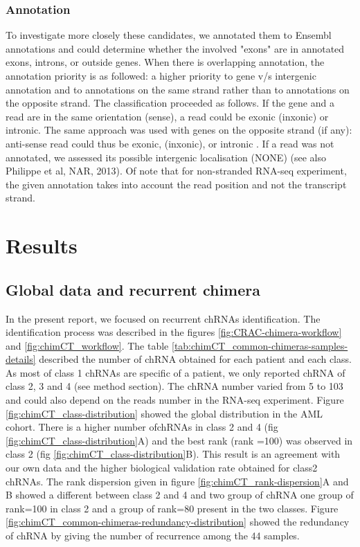 \documentclass[a4paper]{article}
\newcommand{\nbsamples}{44\xspace}
\begin{document}
\subsubsection{Annotation}

To investigate more closely these candidates, we annotated them to Ensembl annotations 
and could determine whether the involved "exons" are in annotated exons, introns, or 
outside genes. When there is overlapping annotation, the annotation priority is as followed: 
a higher priority to gene v/s intergenic annotation and to annotations on the same strand 
rather than to annotations on the opposite strand. The classification proceeded as follows. If 
the gene and a read are in the same orientation (sense), a read could be exonic (inxonic) or 
intronic. The same approach was used with genes on the opposite strand (if any): anti-sense 
read could thus be exonic, (inxonic), or intronic . If a read was not annotated, we assessed 
its possible intergenic localisation (NONE) (see also Philippe et al, NAR, 2013). Of note that 
for non-stranded RNA-seq experiment, the given annotation takes into account the read 
position and not the transcript strand.

\section{Results}

\subsection{Global data and recurrent chimera}

In the present report, we focused on recurrent chRNAs identification. The identification 
process was described in the figures \ref{fig:CRAC-chimera-workflow} and \ref{fig:chimCT_workflow}. The table \ref{tab:chimCT_common-chimeras-samples-details} described the number of chRNA 
obtained for each patient and each class. As most of class 1 chRNAs are specific of a patient, 
we only reported chRNA of class 2, 3 and 4 (see method section). The chRNA number varied 
from 5 to 103 and could also depend on the reads number in the RNA-seq experiment. 
Figure \ref{fig:chimCT_class-distribution} showed the global distribution in the AML cohort. There is a higher number 
ofchRNAs in class 2 and 4 (fig \ref{fig:chimCT_class-distribution}A) and the best rank (rank =100) was observed in class 2 (fig 
\ref{fig:chimCT_class-distribution}B). This result is an agreement with our own data and the higher biological validation rate 
obtained for class2 chRNAs. The rank dispersion given in figure \ref{fig:chimCT_rank-dispersion}A and B showed a different 
between class 2 and 4 and two group of chRNA one group of rank=100 in class 2 and a group 
of rank=80 present in the two classes. Figure \ref{fig:chimCT_common-chimeras-redundancy-distribution} showed the redundancy of chRNA by giving 
the number of recurrence among the \nbsamples samples.
\end{document}
